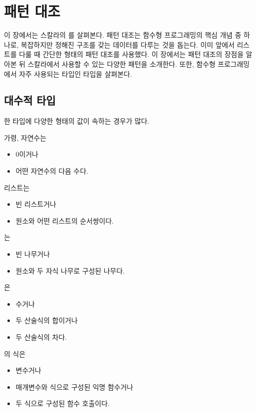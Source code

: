 \chapter{패턴 대조}

이 장에서는 스칼라의 를 살펴본다. 패턴 대조는
함수형 프로그래밍의 핵심 개념 중 하나로, 복잡하지만 정해진 구조를 갖는 데이터를
다루는 것을 돕는다. 이미 앞에서 리스트를 다룰 때 간단한 형태의 패턴 대조를
사용했다. 이 장에서는 패턴 대조의 장점을 알아본 뒤 스칼라에서 사용할 수 있는
다양한 패턴을 소개한다. 또한, 함수형 프로그래밍에서 자주 사용되는 타입인
 타입을 살펴본다.

\section{대수적 타입}

한 타입에 다양한 형태의 값이 속하는 경우가 많다.

가령, 자연수는

\begin{itemize}
\item 0이거나
\item 어떤 자연수의 다음 수다.
\end{itemize}

리스트는

\begin{itemize}
\item 빈 리스트거나
\item 원소와 어떤 리스트의 순서쌍이다.
\end{itemize}

는

\begin{itemize}
\item 빈 나무거나
\item {} 원소와 두 자식 나무로 구성된 나무다.
\end{itemize}

은

\begin{itemize}
\item 수거나
\item 두 산술식의 합이거나
\item 두 산술식의 차다.
\end{itemize}

의 식은

\begin{itemize}
\item 변수거나
\item 매개변수와 식으로 구성된 익명 함수거나
\item 두 식으로 구성된 함수 호출이다.
\end{itemize}

